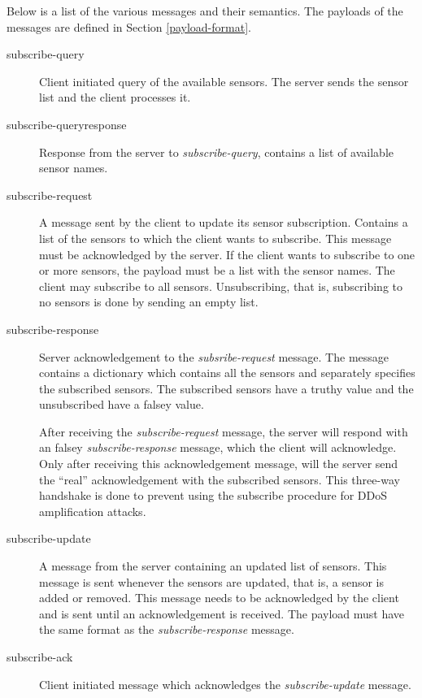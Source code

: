 \documentclass[a4paper]{article}
\begin{document}
\pagebreak

Below is a list of the various messages and their semantics. The payloads of the
messages are defined in Section \ref{payload-format}.
\begin{description}
	\item[subscribe-query] Client initiated query of the available 
	sensors. The server sends the sensor list and the client processes it.
    
	\item[subscribe-queryresponse] Response from the server to 
	\emph{subscribe-query}, contains a list of available sensor names. 
    
	\item[subscribe-request] A message sent by the client to update its sensor
	subscription. Contains a list of the sensors to which the client wants to
	subscribe. This message must be acknowledged by the server. If the client
    wants to subscribe to one or more sensors, the payload must be a list with
    the sensor names. The client may subscribe to all sensors. Unsubscribing,
    that is, subscribing to no sensors is done by sending an empty list.

	\item[subscribe-response] Server acknowledgement to the 
	\emph{subsribe-request} message. The message contains a dictionary which
    contains all the sensors and separately specifies the subscribed sensors.
    The subscribed sensors have a truthy value and the unsubscribed have a falsey
    value. 

  	After receiving the \emph{subscribe-request} message, the server will
    respond with an falsey \emph{subscribe-response} message, which the client
    will acknowledge. Only after receiving this acknowledgement message,
    will the server send the ``real'' acknowledgement with the subscribed sensors.
    This three-way handshake is done to prevent using the subscribe procedure
    for DDoS amplification attacks.

	\item[subscribe-update] A message from the server containing an updated
	list of sensors. This message is sent whenever the sensors are updated,
	that is, a sensor is added or removed. This message needs to be acknowledged 
	by the client and is sent until an acknowledgement is received. The payload
    must have the same format as the \emph{subscribe-response} message.
    
	\item[subscribe-ack] Client initiated message which acknowledges the 
	\emph{subscribe-update} message.
    

\end{description}
\end{document}
